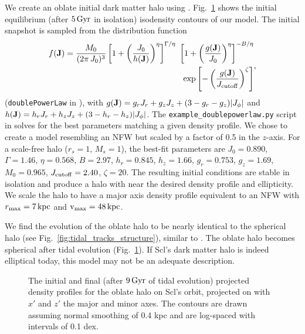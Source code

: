 We create an oblate initial dark matter halo using \agama{}.
Fig.~\ref{fig:oblate_i_f} shows the initial equilibrium (after
\(5\,{\rm Gyr}\) in isolation) isodensity contours of our model. The initial
snapshot is sampled from the distribution function \begin{equation}{
\begin{split}
f({\bf J}) = \frac{M_0}{(2\pi\,J_0)^3} \left[1 + \left(\frac{J_0}{h({\bf J})}\right)^\eta\right]^{\Gamma / \eta} \ \left[1 + \left(\frac{g({\bf J})}{J_0}\right)^\eta\right]^{-B/\eta} \\ \ \exp\left[-\left(\frac{g({\bf J})}{J_{\rm cutoff}} \right)^\zeta\right] 
\end{split},
}\end{equation} (\texttt{doublePowerLaw} in \agama{}), with
\(g({\bf J}) = g_r J_r + g_z J_z + (3-g_r - g_z) |J_\phi|\) and
\(h({\bf J}) = h_rJ_r + h_zJ_z + (3-h_r-h_z) |J_\phi|\). The
\texttt{example\_doublepowerlaw.py} script in \agama{} solves for the
best parameters matching a given density profile. We chose to create a
model resembling an NFW but scaled by a factor of 0.5 in the \(z\)-axis.
For a scale-free halo (\(r_s=1\), \(M_s=1\)), the best-fit parameters
are \(J_0=0.890\), \(\Gamma=1.46\), \(\eta=0.568\), \(B=2.97\),
\(h_r=0.845\), \(h_z=1.66\), \(g_r=0.753\), \(g_z=1.69\), \(M_0=0.965\),
\(J_{\rm cutoff}=2.40\), \(\zeta=20\). The resulting initial conditions
are stable in isolation and produce a halo with near the desired density
profile and ellipticity. We scale the halo to have a major axis density
profile equivalent to an NFW with \(r_{\rm max} = 7\,{\rm kpc}\) and
\({\rm v}_{\rm max}=48\,{\rm kpc}\).

We find the evolution of the oblate halo to be nearly identical to the
spherical halo (see Fig.~\ref{fig:tidal_tracks_structure}), similar to
\citet{battaglia+sollima+nipoti2015}. The oblate halo becomes spherical
after tidal evolution (Fig.~\ref{fig:oblate_i_f}). If Scl's dark matter
halo is indeed elliptical today, this model may not be an adequate
description.

\begin{figure}
\centering
{}
\caption[Oblate halo projected density snapshots]{The initial and final
(after \(9\,{\rm Gyr}\) of tidal evolution) projected density profiles for
the oblate halo on Scl's \smallperi{} orbit, projected on with \(x'\)
and \(z'\) the major and minor axes. The contours are drawn assuming
normal smoothing of 0.4 kpc and are log-spaced with intervals of 0.1
dex.}\label{fig:oblate_i_f}
\end{figure}

